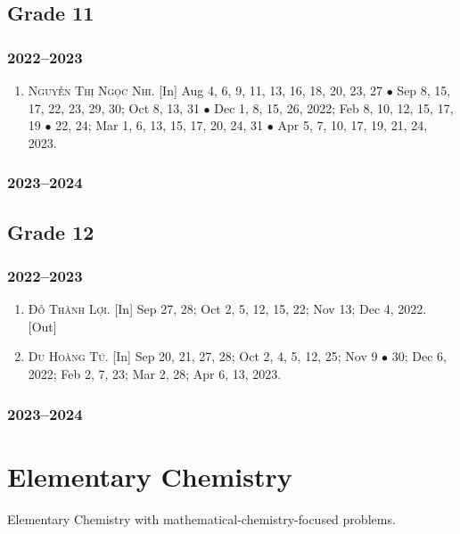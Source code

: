 \documentclass{article}
\begin{document}
\subsection{Grade 11}

\subsubsection{2022--2023}

\begin{enumerate}
	\item \textsc{Nguyễn Thị Ngọc Nhi.} \textsf{[In]} Aug 4, 6, 9, 11, 13, 16, 18, 20, 23, 27 $\bullet$ Sep 8, 15, 17, 22, 23, 29, 30; Oct 8, 13, 31 $\bullet$ Dec 1, 8,  15, 26, 2022; Feb 8, 10, 12, 15, 17, 19 $\bullet$ 22, 24; Mar 1, 6, 13, 15, 17, 20, 24, 31 $\bullet$ Apr 5, 7, 10, 17, 19, 21, 24, 2023.
\end{enumerate}

\subsubsection{2023--2024}

\subsection{Grade 12}

\subsubsection{2022--2023}

\begin{enumerate}
	\item \textsc{Đỗ Thành Lợi.} \textsf{[In]} Sep 27, 28; Oct 2, 5, 12, 15, 22; Nov 13; Dec 4, 2022. \textsf{[Out]}
	\item \textsc{Du Hoàng Tú.} \textsf{[In]} Sep 20, 21, 27, 28; Oct 2, 4, 5, 12, 25; Nov 9 $\bullet$ 30; Dec 6, 2022; Feb 2, 7, 23; Mar 2, 28; Apr 6, 13, 2023.
\end{enumerate}

\subsubsection{2023--2024}


\section{Elementary Chemistry}
Elementary Chemistry with mathematical-chemistry-focused problems.
\end{document}
